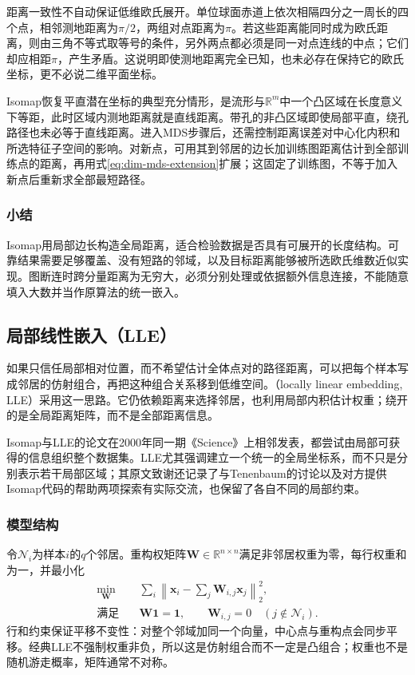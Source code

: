距离一致性不自动保证低维欧氏展开。单位球面赤道上依次相隔四分之一周长的四个点，相邻测地距离为$\pi/2$，两组对点距离为$\pi$。若这些距离能同时成为欧氏距离，则由三角不等式取等号的条件，另外两点都必须是同一对点连线的中点；它们却应相距$\pi$，产生矛盾。这说明即使测地距离完全已知，也未必存在保持它的欧氏坐标，更不必说二维平面坐标。

Isomap恢复平直潜在坐标的典型充分情形，是流形与$\mathbb{R}^m$中一个凸区域在长度意义下等距，此时区域内测地距离就是直线距离。带孔的非凸区域即使局部平直，绕孔路径也未必等于直线距离。进入MDS步骤后，还需控制距离误差对中心化内积和所选特征子空间的影响。对新点，可用其到邻居的边长加训练图距离估计到全部训练点的距离，再用式\eqref{eq:dim-mds-extension}扩展；这固定了训练图，不等于加入新点后重新求全部最短路径。

\subsubsection{小结}

Isomap用局部边长构造全局距离，适合检验数据是否具有可展开的长度结构。可靠结果需要足够覆盖、没有短路的邻域，以及目标距离能够被所选欧氏维数近似实现。图断连时跨分量距离为无穷大，必须分别处理或依据额外信息连接，不能随意填入大数并当作原算法的统一嵌入。

\subsection{局部线性嵌入（LLE）}
\label{sec:dim-lle}

如果只信任局部相对位置，而不希望估计全体点对的路径距离，可以把每个样本写成邻居的仿射组合，再把这种组合关系移到低维空间。（locally linear embedding, LLE）采用这一思路。它仍依赖距离来选择邻居，也利用局部内积估计权重；绕开的是全局距离矩阵，而不是全部距离信息。

Isomap与LLE的论文在2000年同一期《Science》上相邻发表，都尝试由局部可获得的信息组织整个数据集。LLE尤其强调建立一个统一的全局坐标系，而不只是分别表示若干局部区域；其原文致谢还记录了与Tenenbaum的讨论以及对方提供Isomap代码的帮助两项探索有实际交流，也保留了各自不同的局部约束。

\subsubsection{模型结构}

令$\mathcal{N}_i$为样本$i$的$q$个邻居。重构权矩阵$\bm{W}\in\mathbb{R}^{n\times n}$满足非邻居权重为零，每行权重和为一，并最小化
\begin{equation}
  \label{eq:dim-lle-weights}
  \begin{aligned}
    \min_{\bm{W}}\quad&
      \sum_i\left\lVert\bm{x}_i-\sum_j\bm{W}_{i,j}\bm{x}_j
      \right\rVert_2^2,\\
    \text{满足}\quad&
      \bm{W}\bm{1}=\bm{1},\qquad
      \bm{W}_{i,j}=0\quad(j\notin\mathcal{N}_i).
  \end{aligned}
\end{equation}
行和约束保证平移不变性：对整个邻域加同一个向量，中心点与重构点会同步平移。经典LLE不强制权重非负，所以这是仿射组合而不一定是凸组合；权重也不是随机游走概率，矩阵通常不对称。

